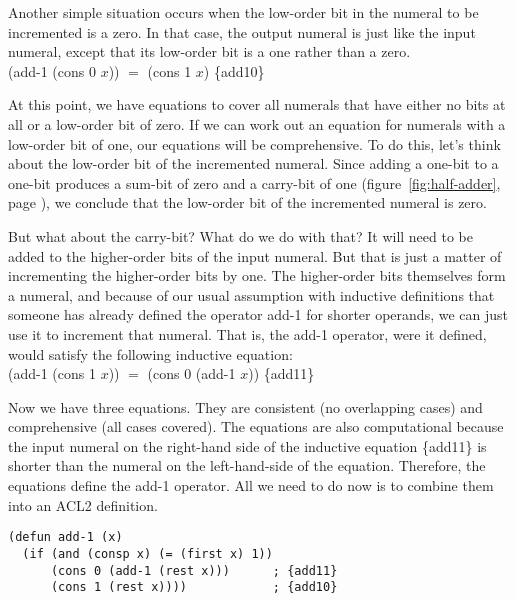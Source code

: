 Another simple situation occurs when the low-order bit in the
numeral to be incremented is a zero.
In that case, the output numeral is
just like the input numeral, except that its
low-order bit is a one rather than a zero.
\\
\vspace{2mm}
\hspace*{2cm}
\textsf{(add-1 (cons 0 $x$))} $=$ \textsf{(cons 1 $x$)}    \hfill \{add10\}

At this point, we have equations to cover all numerals
that have either no bits at all or a low-order bit
of zero. If we can work out an equation for numerals
with a low-order bit of one, our equations will be comprehensive.
To do this, let's think about the
low-order bit of the incremented numeral.
Since adding a one-bit to a one-bit produces a sum-bit
of zero and a carry-bit of one
(figure~\ref{fig:half-adder}, page \pageref{fig:half-adder}),
we conclude that the low-order bit of the incremented numeral
is zero.

But what about the carry-bit? What do we do with that?
It will need to be added to the higher-order bits of
the input numeral. But that is just a matter of incrementing
the higher-order bits by one.
The higher-order bits themselves form a numeral,
and because of our usual assumption with inductive definitions that
someone has already defined the operator
\textsf{add-1} for shorter operands,
we can just use it to increment that numeral.
That is, the \textsf{add-1} operator, were it defined,
would satisfy the following inductive equation:
\\
\vspace{2mm}
\hspace*{2cm}
\textsf{(add-1 (cons 1 $x$))} $=$ \textsf{(cons 0 (add-1 $x$))}   \hfill \{add11\}

Now we have three equations.
They are consistent (no overlapping cases) and
comprehensive (all cases covered).
The equations are also computational because the input numeral
on the right-hand side of the inductive equation
\{add11\} is shorter than
the numeral on the left-hand-side of the equation.
Therefore, the equations define the \textsf{add-1} operator.
All we need to do now is to combine them into an ACL2 definition.

\label{add-1-defun}
\begin{code}
\begin{verbatim}
(defun add-1 (x)
  (if (and (consp x) (= (first x) 1))
      (cons 0 (add-1 (rest x)))      ; {add11}
      (cons 1 (rest x))))            ; {add10}
\end{verbatim}
\end{code}

